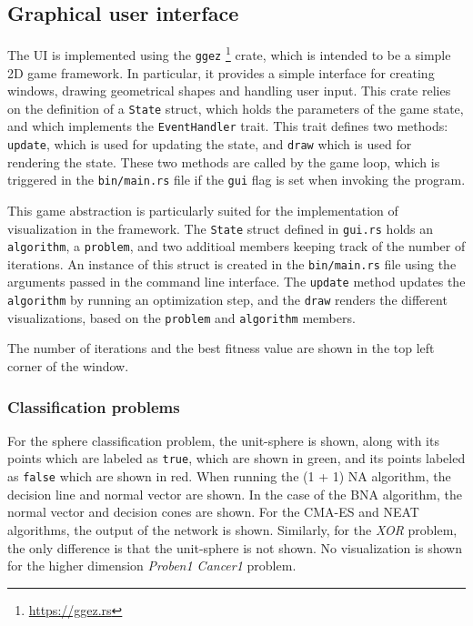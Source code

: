 \subsection{Graphical user interface}

The UI is implemented using the \texttt{ggez} \footnote{\url{https://ggez.rs}} crate, which is intended to be a simple 2D game framework.
In particular, it provides a simple interface for creating windows, drawing geometrical shapes and handling user input.
This crate relies on the definition of a \texttt{State} struct, which holds the parameters of the game state, and which implements the \texttt{EventHandler} trait.
This trait defines two methods: \texttt{update}, which is used for updating the state, and \texttt{draw} which is used for rendering the state.
These two methods are called by the game loop, which is triggered in the \texttt{bin/main.rs} file if the \texttt{gui} flag is set when invoking the program.

This game abstraction is particularly suited for the implementation of visualization in the framework.
The \texttt{State} struct defined in \texttt{gui.rs} holds an \texttt{algorithm}, a \texttt{problem}, and two additioal members keeping track of the number of iterations.
An instance of this struct is created in the \texttt{bin/main.rs} file using the arguments passed in the command line interface.
The \texttt{update} method updates the \texttt{algorithm} by running an optimization step, and the \texttt{draw} renders the different visualizations, based on
the \texttt{problem} and \texttt{algorithm} members.

The number of iterations and the best fitness value are shown in the top left corner of the window.

\subsubsection{Classification problems}

For the sphere classification problem, the unit-sphere is shown, along with its points which are labeled as \texttt{true}, which are shown in green, and its points
labeled as \texttt{false} which are shown in red. When running the (1 + 1) NA algorithm, the decision line and normal vector are shown. In the case of the BNA algorithm,
the normal vector and decision cones are shown. For the CMA-ES and NEAT algorithms, the output of the network is shown.
Similarly, for the \textit{XOR} problem, the only difference is that the unit-sphere is not shown.
No visualization is shown for the higher dimension \textit{Proben1 Cancer1} problem.

